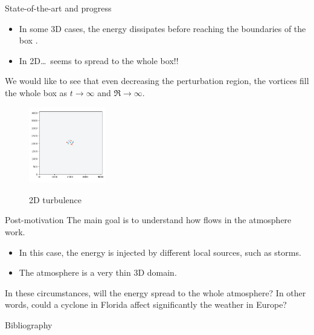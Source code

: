 \documentclass{beamer} %
\begin{document}
\begin{frame}{State-of-the-art and progress}
	\begin{itemize}
		\item In some 3D cases, the energy dissipates before reaching the boundaries of the box \cite{alexakis}.
		\item In 2D\ldots\ seems to spread to the whole box!!
	\end{itemize}
	We would like to see that even decreasing the perturbation region, the vortices fill the whole box as $t\to\infty$ and $\Re\to\infty$.

	\vspace{0.3cm}
	\begin{figure}
		\centering
		\href{./videos/Re64.mp4}{
			\includegraphics[width=0.3\textwidth]{images/FlowD_fw.002.png}
		}
		\caption{2D turbulence}
	\end{figure}
\end{frame}
\begin{frame}{Post-motivation}
	The main goal is to understand how flows in the atmosphere work.
	\begin{itemize}
		\item In this case, the energy is injected by different local sources, such as storms.
		\item The atmosphere is a very thin 3D domain.
	\end{itemize}
	In these circumstances, will the energy spread to the whole atmosphere? In other words, could a cyclone in Florida affect significantly the weather in Europe?
\end{frame}

\thispagestyle{empty}
\begin{frame}[noframenumbering]{Bibliography}
	\printbibliography
\end{frame}
\end{document}
